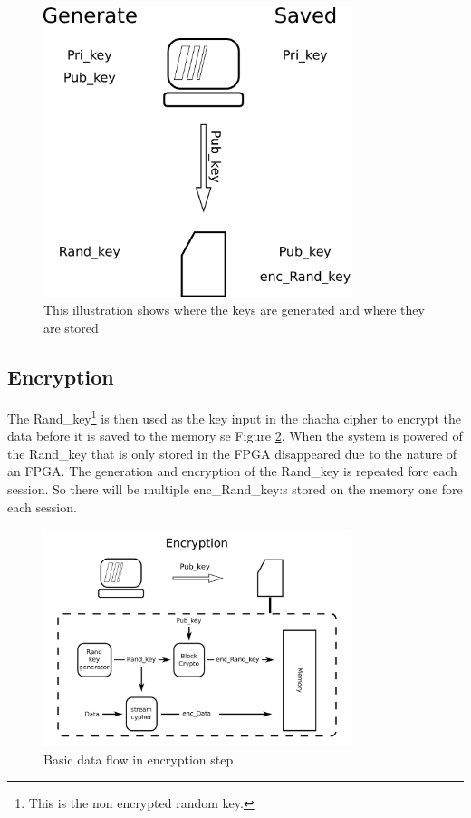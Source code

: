 \documentclass[]{article}
\begin{document}
\begin{figure}[h]
	\centering
	\includegraphics[width=0.8\textwidth]{ilustrations/Key_generations.pdf}
	\caption{This illustration shows where the keys are generated and where they are stored}
	\label{fig:key_gen}
\end{figure}
\clearpage
\newpage
\subsection{Encryption}
The Rand\_key\footnote{This is the non encrypted random key.} is then used as the key input in the chacha cipher to encrypt the data before it is saved to the memory se Figure \ref{fig:encrypt}.
When the system is powered of the Rand\_key that is only stored in the FPGA disappeared due to the nature of an FPGA.
The generation and encryption of the Rand\_key is repeated fore each session.
So there will be multiple enc\_Rand\_key:s stored on the memory one fore each session.

\begin{figure}[h]
	\centering
	\includegraphics[width=0.8\textwidth]{ilustrations/encryption.pdf}
	\caption{Basic data flow in encryption step}
	\label{fig:encrypt}
\end{figure}
\clearpage
\newpage
\end{document}
